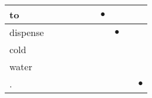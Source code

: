 \documentclass[landscape]{article}
\newcommand{\ssp}{\hspace{2pt}}
\newcommand{\mex}{\cellcolor{g}$\bullet$}
\begin{document}
\begin{tabular}{|l|p{10pt}|p{10pt}|p{10pt}|p{10pt}|p{10pt}|p{10pt}|p{10pt}|p{10pt}|p{10pt}|}
\hline
\ssp \cellcolor{ref5}to \ssp&\hspace{2pt}&\hspace{2pt}&\hspace{2pt}&\hspace{2pt}&\hspace{2pt}&\hspace{2pt}\mex&\hspace{2pt}&\hspace{2pt}&\hspace{2pt}\\
\hline
\ssp \cellcolor{ref6}dispense \ssp&\hspace{2pt}&\hspace{2pt}&\hspace{2pt}&\hspace{2pt}&\hspace{2pt}&\hspace{2pt}&\hspace{2pt}\mex&\hspace{2pt}&\hspace{2pt}\\
\hline
\ssp cold \ssp&\hspace{2pt}&\hspace{2pt}&\hspace{2pt}&\hspace{2pt}&\hspace{2pt}&\hspace{2pt}&\hspace{2pt}&\hspace{2pt}&\hspace{2pt}\\
\hline
\ssp water \ssp&\hspace{2pt}&\hspace{2pt}&\hspace{2pt}&\hspace{2pt}&\hspace{2pt}&\hspace{2pt}&\hspace{2pt}&\hspace{2pt}&\hspace{2pt}\\
\hline
\ssp \cellcolor{ref8}. \ssp&\hspace{2pt}&\hspace{2pt}&\hspace{2pt}&\hspace{2pt}&\hspace{2pt}&\hspace{2pt}&\hspace{2pt}&\hspace{2pt}&\hspace{2pt}\mex\\
\hline
\end{tabular}
\end{document}
